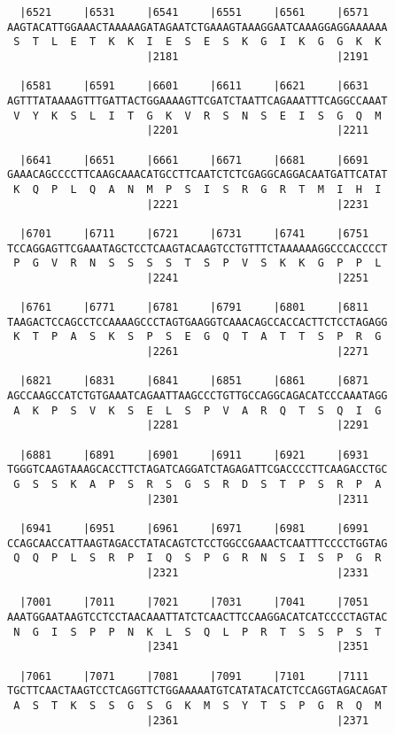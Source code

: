 \documentclass{article}
\begin{document}
\begin{Verbatim}
  |6521     |6531     |6541     |6551     |6561     |6571   
AAGTACATTGGAAACTAAAAAGATAGAATCTGAAAGTAAAGGAATCAAAGGAGGAAAAAA
 S  T  L  E  T  K  K  I  E  S  E  S  K  G  I  K  G  G  K  K 
                      |2181                         |2191   
  
  |6581     |6591     |6601     |6611     |6621     |6631   
AGTTTATAAAAGTTTGATTACTGGAAAAGTTCGATCTAATTCAGAAATTTCAGGCCAAAT
 V  Y  K  S  L  I  T  G  K  V  R  S  N  S  E  I  S  G  Q  M 
                      |2201                         |2211   
  
  |6641     |6651     |6661     |6671     |6681     |6691   
GAAACAGCCCCTTCAAGCAAACATGCCTTCAATCTCTCGAGGCAGGACAATGATTCATAT
 K  Q  P  L  Q  A  N  M  P  S  I  S  R  G  R  T  M  I  H  I 
                      |2221                         |2231   
  
  |6701     |6711     |6721     |6731     |6741     |6751   
TCCAGGAGTTCGAAATAGCTCCTCAAGTACAAGTCCTGTTTCTAAAAAAGGCCCACCCCT
 P  G  V  R  N  S  S  S  S  T  S  P  V  S  K  K  G  P  P  L 
                      |2241                         |2251   
  
  |6761     |6771     |6781     |6791     |6801     |6811   
TAAGACTCCAGCCTCCAAAAGCCCTAGTGAAGGTCAAACAGCCACCACTTCTCCTAGAGG
 K  T  P  A  S  K  S  P  S  E  G  Q  T  A  T  T  S  P  R  G 
                      |2261                         |2271   
  
  |6821     |6831     |6841     |6851     |6861     |6871   
AGCCAAGCCATCTGTGAAATCAGAATTAAGCCCTGTTGCCAGGCAGACATCCCAAATAGG
 A  K  P  S  V  K  S  E  L  S  P  V  A  R  Q  T  S  Q  I  G 
                      |2281                         |2291   
  
  |6881     |6891     |6901     |6911     |6921     |6931   
TGGGTCAAGTAAAGCACCTTCTAGATCAGGATCTAGAGATTCGACCCCTTCAAGACCTGC
 G  S  S  K  A  P  S  R  S  G  S  R  D  S  T  P  S  R  P  A 
                      |2301                         |2311   
  
  |6941     |6951     |6961     |6971     |6981     |6991   
CCAGCAACCATTAAGTAGACCTATACAGTCTCCTGGCCGAAACTCAATTTCCCCTGGTAG
 Q  Q  P  L  S  R  P  I  Q  S  P  G  R  N  S  I  S  P  G  R 
                      |2321                         |2331   
  
  |7001     |7011     |7021     |7031     |7041     |7051   
AAATGGAATAAGTCCTCCTAACAAATTATCTCAACTTCCAAGGACATCATCCCCTAGTAC
 N  G  I  S  P  P  N  K  L  S  Q  L  P  R  T  S  S  P  S  T 
                      |2341                         |2351   
  
  |7061     |7071     |7081     |7091     |7101     |7111   
TGCTTCAACTAAGTCCTCAGGTTCTGGAAAAATGTCATATACATCTCCAGGTAGACAGAT
 A  S  T  K  S  S  G  S  G  K  M  S  Y  T  S  P  G  R  Q  M 
                      |2361                         |2371   
  

\end{Verbatim}
\end{document}
